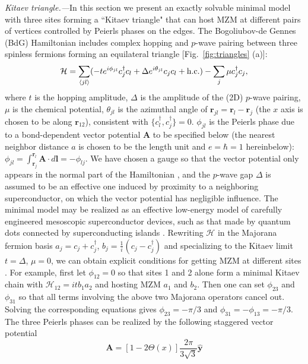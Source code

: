 \documentclass[aps,prb,twocolumn,showpacs,amsmath,amssymb,superscriptaddress]{revtex4-2}
\let\oldhat\hat
\renewcommand{\hat}[1]{\oldhat{\mathbf{#1}}}
\renewcommand{\vec}[1]{\mathbf{#1}}
\newcommand{\ham}{\mathcal{H}}
\newcommand{\cc}{c^{\dagger}}
\newcommand{\de}{\Delta}
\begin{document}
\emph{Kitaev triangle.---}In this section we present an exactly solvable minimal model with three sites forming a ``Kitaev triangle" that can host MZM at different pairs of vertices controlled by Peierls phases on the edges. The Bogoliubov-de Gennes (BdG) Hamiltonian includes complex hopping and $p$-wave pairing between three spinless fermions forming an equilateral triangle [Fig.~\ref{fig:triangles} (a)]:
\begin{equation}\label{eq:HBdG}
  \ham = \sum_{\langle j l \rangle} (-te^{i\phi_{jl}}\cc_{j} c_l + \de e^{i\theta_{jl}} c_{j} c_l + {\rm h.c.}) - \sum_{j} \mu \cc_j c_j,
\end{equation}
where $t$ is the hopping amplitude, $\de$ is the amplitude of the (2D) $p$-wave pairing, $\mu$ is the chemical potential, $\theta_{jl}$ is the azimuthal angle of $\mathbf r_{jl} = \mathbf r_l - \mathbf r_j$ (the $x$ axis is chosen to be along $\mathbf r_{12}$), consistent with $\{c^\dag_l, c^\dag_j\} = 0$. $\phi_{jl}$ is the Peierls phase due to a bond-dependent vector potential $\mathbf A$ to be specified below (the nearest neighbor distance $a$ is chosen to be the length unit and $e=\hbar=1$ hereinbelow): $\phi_{jl} = \int_{\mathbf r_j}^{\mathbf r_{l}} \vec{A} \cdot d\vec{l} = -\phi_{lj}$. We have chosen a gauge so that the vector potential only appears in the normal part of the Hamiltonian \cite{DeGennes_book}, and the $p$-wave gap $\Delta$ is assumed to be an effective one induced by proximity to a neighboring superconductor, on which the vector potential has negligible influence. The minimal model may be realized as an effective low-energy model of carefully engineered mesoscopic superconductor devices, such as that made by quantum dots connected by superconducting islands \cite{dvirRealizationMinimalKitaev2023}. Rewriting $\mathcal{H}$ in the Majorana fermion basis $a_{j} = c_j + c^\dag_j$, $b_j = \frac{1}{i}(c_j - c^\dag_j)$ and specializing to the Kitaev limit $t=\de$, $\mu=0$, we can obtain explicit conditions for getting MZM at different sites \cite{supp}. For example, first let $\phi_{12} = 0$ so that sites 1 and 2 alone form a minimal Kitaev chain with $\mathcal{H}_{12} = itb_1a_2$ and hosting MZM $a_1$ and $b_2$. Then one can set $\phi_{23}$ and $\phi_{31}$ so that all terms involving the above two Majorana operators cancel out. Solving the corresponding equations gives $\phi_{23} = -\pi/3$ and $\phi_{31} =-\phi_{13} = -\pi/3$. The three Peierls phases can be realized by the following staggered vector potential
\begin{equation}\label{eq:Astep}
  \vec{A} =\left[1-2\Theta(x)\right]\frac{2 \pi}{3\sqrt{3}} \hat{y}
\end{equation}
\end{document}
